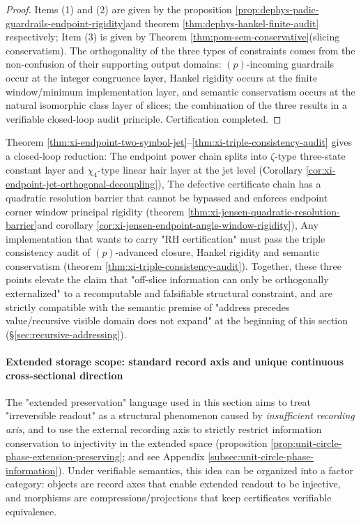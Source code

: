 \begin{proof}
Items (1) and (2) are given by the proposition \ref{prop:dephys-padic-guardrails-endpoint-rigidity} ​​and theorem \ref{thm:dephys-hankel-finite-audit} respectively;
Item (3) is given by Theorem \ref{thm:pom-sem-conservative} ​​(slicing conservatism).
The orthogonality of the three types of constraints comes from the non-confusion of their supporting output domains: \((p)\)-incoming guardrails occur at the integer congruence layer, Hankel rigidity occurs at the finite window/minimum implementation layer, and semantic conservatism occurs at the natural isomorphic class layer of slices; the combination of the three results in a verifiable closed-loop audit principle. Certification completed.
\end{proof}

\begin{remark}\label{rem:xi-auditable-reduction-closed-loop}
Theorem \ref{thm:xi-endpoint-two-symbol-jet}--\ref{thm:xi-triple-consistency-audit} gives a closed-loop reduction:
The endpoint power chain splits into \(\zeta\)-type three-state constant layer and \(\chi_4\)-type linear hair layer at the jet level (Corollary \ref{cor:xi-endpoint-jet-orthogonal-decoupling}),
The defective certificate chain has a quadratic resolution barrier that cannot be bypassed and enforces endpoint corner window principal rigidity (theorem \ref{thm:xi-jensen-quadratic-resolution-barrier} ​​and corollary \ref{cor:xi-jensen-endpoint-angle-window-rigidity}),
Any implementation that wants to carry "RH certification" must pass the triple consistency audit of \((p)\)-advanced closure, Hankel rigidity and semantic conservatism (theorem \ref{thm:xi-triple-consistency-audit}).
Together, these three points elevate the claim that "off-slice information can only be orthogonally externalized" to a recomputable and falsifiable structural constraint, and are strictly compatible with the semantic premise of "address precedes value/recursive visible domain does not expand" at the beginning of this section (\S\ref{sec:recursive-addressing}).
\end{remark}

\paragraph{Extended storage scope: standard record axis and unique continuous cross-sectional direction}
The "extended preservation" language used in this section aims to treat "irreversible readout" as a structural phenomenon caused by \emph{insufficient recording axis}, and to use the external recording axis to strictly restrict information conservation to injectivity in the extended space (proposition \ref{prop:unit-circle-phase-extension-preserving}; and see Appendix \ref{subsec:unit-circle-phase-information}).
Under verifiable semantics, this idea can be organized into a factor category: objects are record axes that enable extended readout to be injective, and morphisms are compressions/projections that keep certificates verifiable equivalence.

